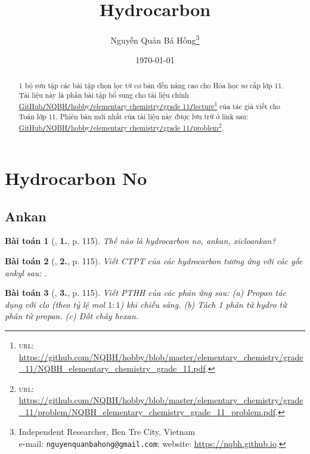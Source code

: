 \documentclass{article}
\title{Hydrocarbon}
\author{Nguyễn Quản Bá Hồng\footnote{Independent Researcher, Ben Tre City, Vietnam\\e-mail: \texttt{nguyenquanbahong@gmail.com}; website: \url{https://nqbh.github.io}.}}
\date{\today}
\numberwithin{equation}{section}
\newtheorem{baitoan}{Bài toán}[section]
\begin{document}
\maketitle
\begin{abstract}
	1 bộ sưu tập các bài tập chọn lọc từ cơ bản đến nâng cao cho Hóa học sơ cấp lớp 11. Tài liệu này là phần bài tập bổ sung cho tài liệu chính \href{https://github.com/NQBH/hobby/blob/master/elementary_chemistry/grade_11/NQBH_elementary_chemistry_grade_11.pdf}{GitHub\texttt{/}NQBH\texttt{/}hobby\texttt{/}elementary chemistry\texttt{/}grade 11\texttt{/}lecture}\footnote{\textsc{url}: \url{https://github.com/NQBH/hobby/blob/master/elementary_chemistry/grade_11/NQBH_elementary_chemistry_grade_11.pdf}.} của tác giả viết cho Toán lớp 11. Phiên bản mới nhất của tài liệu này được lưu trữ ở link sau: \href{https://github.com/NQBH/hobby/blob/master/elementary_chemistry/grade_11/problem/NQBH_elementary_chemistry_grade_11_problem.pdf}{GitHub\texttt{/}NQBH\texttt{/}hobby\texttt{/}elementary chemistry\texttt{/}grade 11\texttt{/}problem}\footnote{\textsc{url}: \url{https://github.com/NQBH/hobby/blob/master/elementary_chemistry/grade_11/problem/NQBH_elementary_chemistry_grade_11_problem.pdf}.}.
\end{abstract}
\tableofcontents
\newpage


\section{Hydrocarbon No}

\subsection{Ankan}

\begin{baitoan}[\cite{SGK_Hoa_Hoc_11_co_ban}, \textbf{1.}, p. 115]
	Thế nào là hydrocarbon no, ankan, xicloankan?
\end{baitoan}

\begin{baitoan}[\cite{SGK_Hoa_Hoc_11_co_ban}, \textbf{2.}, p. 115]
	Viết CTPT của các hydrocarbon tương ứng với các gốc ankyl sau: \emph{}.
\end{baitoan}

\begin{baitoan}[\cite{SGK_Hoa_Hoc_11_co_ban}, \textbf{3.}, p. 115]
	Viết PTHH của các phản ứng sau: (a) Propan tác dụng với clo (theo tỷ lệ mol $1:1$) khi chiếu sáng. (b) Tách 1 phân tử hydro từ phân tử propan. (c) Đốt cháy hexan.
\end{baitoan}
\end{document}
